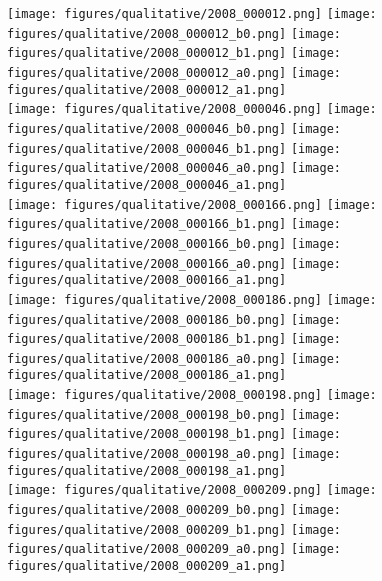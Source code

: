 \documentclass[runningheads]{llncs}
\begin{document}
\begin{figure*}
 \centering
\texttt{[image: figures/qualitative/2008\_000012.png]}
\texttt{[image: figures/qualitative/2008\_000012\_b0.png]}
\texttt{[image: figures/qualitative/2008\_000012\_b1.png]}
\texttt{[image: figures/qualitative/2008\_000012\_a0.png]}
\texttt{[image: figures/qualitative/2008\_000012\_a1.png]}\\
\texttt{[image: figures/qualitative/2008\_000046.png]}
\texttt{[image: figures/qualitative/2008\_000046\_b0.png]}
\texttt{[image: figures/qualitative/2008\_000046\_b1.png]}
\texttt{[image: figures/qualitative/2008\_000046\_a0.png]}
\texttt{[image: figures/qualitative/2008\_000046\_a1.png]}\\
\texttt{[image: figures/qualitative/2008\_000166.png]}
\texttt{[image: figures/qualitative/2008\_000166\_b1.png]}
\texttt{[image: figures/qualitative/2008\_000166\_b0.png]}
\texttt{[image: figures/qualitative/2008\_000166\_a0.png]}
\texttt{[image: figures/qualitative/2008\_000166\_a1.png]}\\
\texttt{[image: figures/qualitative/2008\_000186.png]}
\texttt{[image: figures/qualitative/2008\_000186\_b0.png]}
\texttt{[image: figures/qualitative/2008\_000186\_b1.png]}
\texttt{[image: figures/qualitative/2008\_000186\_a0.png]}
\texttt{[image: figures/qualitative/2008\_000186\_a1.png]}\\
\texttt{[image: figures/qualitative/2008\_000198.png]}
\texttt{[image: figures/qualitative/2008\_000198\_b0.png]}
\texttt{[image: figures/qualitative/2008\_000198\_b1.png]}
\texttt{[image: figures/qualitative/2008\_000198\_a0.png]}
\texttt{[image: figures/qualitative/2008\_000198\_a1.png]}\\
\texttt{[image: figures/qualitative/2008\_000209.png]}
\texttt{[image: figures/qualitative/2008\_000209\_b0.png]}
\texttt{[image: figures/qualitative/2008\_000209\_b1.png]}
\texttt{[image: figures/qualitative/2008\_000209\_a0.png]}
\texttt{[image: figures/qualitative/2008\_000209\_a1.png]}\\

\end{figure*}
\end{document}
